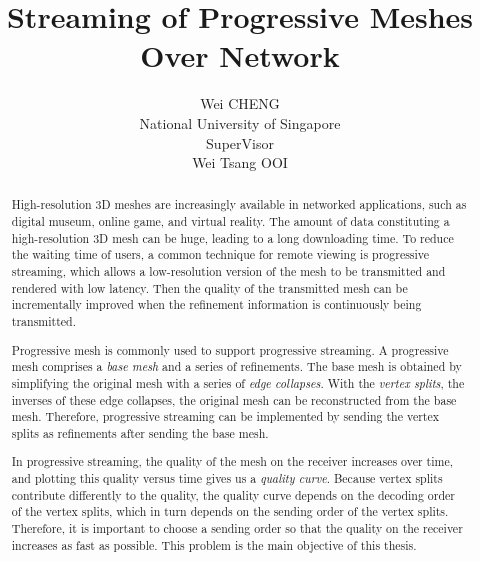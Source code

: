 \documentclass[11pt, a4paper]{report}
\title{Streaming of Progressive Meshes Over Network}
\author{Wei CHENG\\
National University of Singapore\\
SuperVisor\\
Wei Tsang OOI}
\begin{document}
\maketitle
\doublespacing
\begin{abstract}
    High-resolution 3D meshes are increasingly available in networked
    applications, such as digital museum, online game, and virtual reality.
    The amount of data constituting a high-resolution 3D mesh can be
    huge, leading to a long downloading time. 
    To reduce the waiting time of users, 
    a common technique for remote viewing is progressive streaming,
    which allows a low-resolution version of the mesh to be transmitted
    and rendered with low latency. Then the quality of the transmitted 
    mesh can be incrementally improved when the refinement information
    is continuously being transmitted.

    Progressive mesh is commonly used to support progressive
    streaming. A progressive mesh comprises a \emph{base mesh} and a series
    of refinements. The base mesh is obtained by simplifying the original mesh
    with a series of \emph{edge collapses}.
    With the \emph{vertex splits}, the inverses of these edge
    collapses, the original mesh can be reconstructed from the base mesh.
    Therefore, progressive streaming can be implemented by sending the vertex
    splits as refinements after sending the base mesh.
    
    In progressive streaming, the quality of the mesh on the receiver
    increases over time, and plotting this quality versus time gives us a \emph{quality curve}. 
    Because vertex splits contribute differently to the quality,
    the quality curve depends on the decoding order of the vertex splits,
    which in turn depends on the sending order of the vertex splits.
    Therefore, it is important to choose a sending order so that the 
    quality on the receiver increases as fast as possible.
    This problem is the main objective of this thesis. 
       

\end{abstract}
\end{document}
